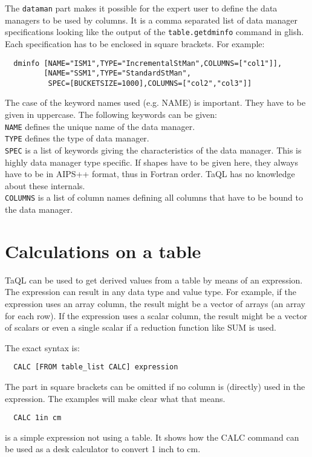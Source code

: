 The \texttt{dataman} part makes it possible for the expert user to
define the data managers to be used by columns. It is a comma separated
list of data manager specifications looking like the output of the
\texttt{table.getdminfo} command in glish.
Each specification has to be enclosed in square brackets.
For example:
\begin{verbatim}
  dminfo [NAME="ISM1",TYPE="IncrementalStMan",COLUMNS=["col1"]],
         [NAME="SSM1",TYPE="StandardStMan",
          SPEC=[BUCKETSIZE=1000],COLUMNS=["col2","col3"]]
\end{verbatim}
The case of the keyword names used (e.g. NAME) is important.
They have to be given in uppercase. The following keywords can be
given:
\\\texttt{NAME} defines the unique name of the data manager.
\\\texttt{TYPE} defines the type of data manager.
\\\texttt{SPEC} is a list of keywords giving the characteristics of the
data manager. This is highly data manager type specific. If shapes
have to be given here, they always have to be in AIPS++ format,
thus in Fortran order. TaQL has no knowledge about these internals.
\\\texttt{COLUMNS} is a list of column names defining all columns that
have to be bound to the data manager.


\section{\label{TAQL:CALCULATING}Calculations on a table}
TaQL can be used to get derived values from a table by means of an
expression. The expression can result in any data type and value type.
For example, if the expression uses an array column, the result might
be a vector of arrays (an array for each row). If the expression uses
a scalar column, the result might be a vector of scalars or even a
single scalar if a reduction function like SUM is used.

The exact syntax is:
\begin{verbatim}
  CALC [FROM table_list CALC] expression
\end{verbatim}
The part in square brackets can be omitted if no column is (directly)
used in the expression. The examples will make clear what that means.

\begin{verbatim}
  CALC 1in cm
\end{verbatim}
is a simple expression not using a table. It shows how the CALC
command can be used as a desk calculator to convert 1 inch to cm.

